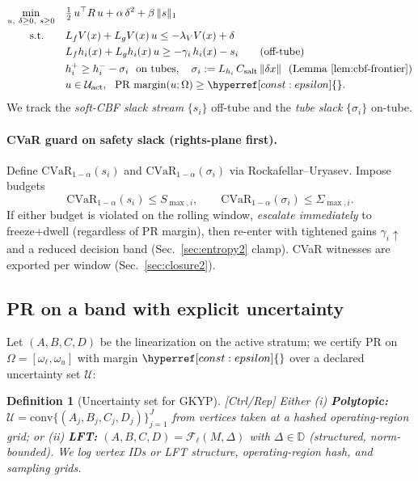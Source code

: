 \documentclass[10pt]{article}
\newcommand{\layertag}[1]{\textup{[#1]}}
\newcommand{\constref}[1]{\hyperref[const:#1]{\ensuremath{\csname constsym#1\endcsname}}}
\newtheorem{definition}{Definition}
\begin{document}
\[
\begin{aligned}
\min_{u,\ \delta\ge0,\ s\ge 0}\quad & \tfrac12\,u^\top R\,u + \alpha\,\delta^2 + \beta\,\|s\|_1 \\
\text{s.t.}\qquad & L_f V(x)+L_g V(x)\,u \le -\lambda_V V(x) + \delta \\
& L_f h_i(x)+L_g h_i(x)\,u \ge -\gamma_i\,h_i(x) - s_i \qquad \text{(off-tube)}\\
& h_i^+ \ge h_i^- - \sigma_i \ \ \text{on tubes},\quad \sigma_i:=L_{h_i}\,C_{\mathrm{salt}}\,\|\delta x\| \ \ (\text{Lemma \ref{lem:cbf-frontier}})\\
& u\in \mathcal U_{\text{act}},\ \ \text{PR margin}(u;\Omega)\ge \constref{epsilon}.
\end{aligned}
\]
We track the \emph{soft-CBF slack stream} $\{s_i\}$ off-tube and the \emph{tube slack} $\{\sigma_i\}$ on-tube.

\paragraph{CVaR guard on safety slack (rights-plane first).}
Define $\mathrm{CVaR}_{1-\alpha}(s_i)$ and $\mathrm{CVaR}_{1-\alpha}(\sigma_i)$ via Rockafellar–Uryasev. Impose budgets
\[
\mathrm{CVaR}_{1-\alpha}(s_i) \le S_{\max,i},\qquad
\mathrm{CVaR}_{1-\alpha}(\sigma_i) \le \Sigma_{\max,i}.
\]
If either budget is violated on the rolling window, \emph{escalate immediately} to freeze+dwell (regardless of PR margin), then re-enter with tightened gains $\gamma_i\uparrow$ and a reduced decision band (Sec.~\ref{sec:entropy2} clamp). CVaR witnesses are exported per window (Sec.~\ref{sec:closure2}).

\subsection*{PR on a band with explicit uncertainty}
Let $(A,B,C,D)$ be the linearization on the active stratum; we certify PR on $\Omega=[\omega_\ell,\omega_u]$ with margin $\constref{epsilon}$ over a declared uncertainty set $\mathcal U$:

\begin{definition}[Uncertainty set for GKYP]\label{def:unc-set}
\emph{\layertag{Ctrl/Rep}}
Either (i) \textbf{Polytopic:} $\mathcal U=\mathrm{conv}\{(A_j,B_j,C_j,D_j)\}_{j=1}^J$ from vertices taken at a hashed operating-region grid; or (ii) \textbf{LFT:} $(A,B,C,D)=\mathcal F_\ell(M,\Delta)$ with $\Delta\in\mathbb D$ (structured, norm-bounded). We log vertex IDs or LFT structure, operating-region hash, and sampling grids.
\end{definition}
\end{document}
